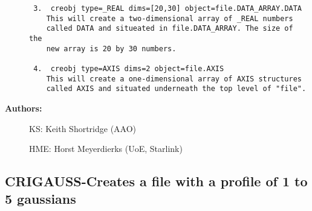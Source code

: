 \begin{description}
\begin{verbatim}
 3.  creobj type=_REAL dims=[20,30] object=file.DATA_ARRAY.DATA
    This will create a two-dimensional array of _REAL numbers
    called DATA and situeated in file.DATA_ARRAY. The size of the
    new array is 20 by 30 numbers.

 4.  creobj type=AXIS dims=2 object=file.AXIS
    This will create a one-dimensional array of AXIS structures
    called AXIS and situated underneath the top level of "file".

\end{verbatim}

\item [{\bf Authors:}]
 KS: Keith Shortridge (AAO)

 HME: Horst Meyerdierks (UoE, Starlink)

\end{description}
\subsection{CRIGAUSS-\label{CRIGAUSS}Creates a file with a profile of 1 to 5 gaussians}
